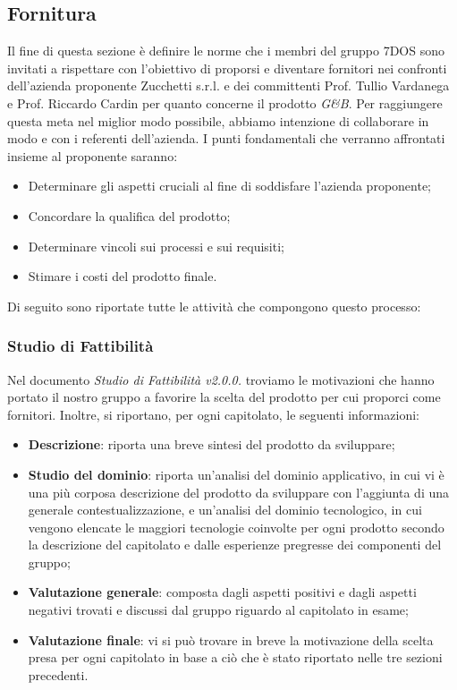 \subsection{Fornitura}
Il fine di questa sezione è definire le norme che i membri del gruppo 7DOS sono invitati a rispettare con l'obiettivo di proporsi e diventare fornitori nei confronti dell'azienda proponente Zucchetti s.r.l. e dei committenti Prof. Tullio Vardanega e Prof. Riccardo Cardin per quanto concerne il prodotto \emph{G\&B}.
Per raggiungere questa meta nel miglior modo possibile, abbiamo intenzione di collaborare in modo  e  con i referenti dell'azienda.
I punti fondamentali che verranno affrontati insieme al proponente saranno:
\begin{itemize}
\item Determinare gli aspetti cruciali al fine di soddisfare l'azienda proponente;
\item Concordare la qualifica del prodotto;
\item Determinare vincoli sui processi e sui requisiti;
\item Stimare i costi del prodotto finale.
\end{itemize}
Di seguito sono riportate tutte le attività che compongono questo processo:
\subsubsection{Studio di Fattibilità}
Nel documento \emph{Studio di Fattibilità v2.0.0.} troviamo le motivazioni che hanno portato il nostro gruppo a favorire la scelta del prodotto per cui proporci come fornitori. Inoltre, si riportano, per ogni capitolato, le seguenti informazioni:
\begin{itemize}
 	\item\textbf{{Descrizione}}: riporta una breve sintesi del prodotto da sviluppare;
 	\item\textbf{{Studio del dominio}}: riporta un'analisi del dominio applicativo, in cui vi è una più corposa descrizione del prodotto da sviluppare con l'aggiunta di una generale contestualizzazione, e un'analisi del dominio tecnologico, in cui vengono elencate le maggiori tecnologie coinvolte per ogni prodotto secondo la descrizione del capitolato e dalle esperienze pregresse dei componenti del gruppo;
 	\item\textbf{{Valutazione generale}}: composta dagli aspetti positivi e dagli aspetti negativi trovati e discussi dal gruppo riguardo al capitolato in esame;
 	\item\textbf{{Valutazione finale}}: vi si può trovare in breve la motivazione della scelta presa per ogni capitolato in base a ciò che è stato riportato nelle tre sezioni precedenti.
\end{itemize}
\pagebreak
